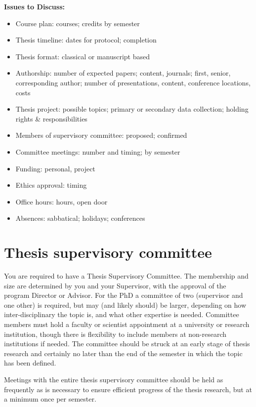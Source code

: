 \documentclass[
]{book}
\providecommand{\tightlist}{%
  \setlength{\itemsep}{0pt}\setlength{\parskip}{0pt}}
\begin{document}
\textbf{Issues to Discuss:}

\begin{itemize}
\tightlist
\item
  Course plan: courses; credits by semester\\
\item
  Thesis timeline: dates for protocol; completion
\item
  Thesis format: classical or manuscript based
\item
  Authorship: number of expected papers; content, journals; first, senior, corresponding author; number of presentations, content, conference locations, costs
\item
  Thesis project: possible topics; primary or secondary data collection; holding rights \& responsibilities
\item
  Members of supervisory committee: proposed; confirmed
\item
  Committee meetings: number and timing; by semester
\item
  Funding: personal, project
\item
  Ethics approval: timing
\item
  Office hours: hours, open door
\item
  Absences: sabbatical; holidays; conferences
\end{itemize}

\hypertarget{thesis-supervisory-committee}{%
\section{Thesis supervisory committee}\label{thesis-supervisory-committee}}

You are required to have a Thesis Supervisory Committee. The membership and size are determined by you and your Supervisor, with the approval of the program Director or Advisor. For the PhD a committee of two (supervisor and one other) is required, but may (and likely should) be larger, depending on how inter-disciplinary the topic is, and what other expertise is needed. Committee members must hold a faculty or scientist appointment at a university or research institution, though there is flexibility to include members at non-research institutions if needed. The committee should be struck at an early stage of thesis research and certainly no later than the end of the semester in which the topic has been defined.

Meetings with the entire thesis supervisory committee should be held as frequently as is necessary to ensure efficient progress of the thesis research, but at a minimum once per semester.
\end{document}
